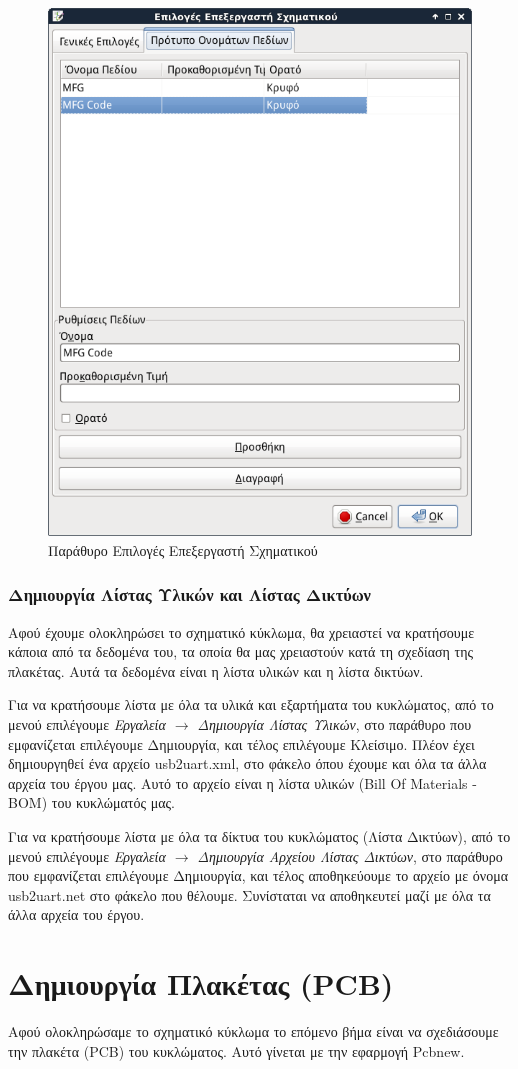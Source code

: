 \documentclass[a4paper]{article}
\begin{document}
\begin{figure}
  \begin{center}
    \includegraphics[width=.35\textwidth]{img/eesch-dial-templ.png}
    \caption{Παράθυρο Επιλογές Επεξεργαστή Σχηματικού}
    \label{fig:eesch-dial-templ}
  \end{center}
\end{figure}

\subsubsection{Δημιουργία Λίστας Υλικών και Λίστας Δικτύων}
Αφού έχουμε ολοκληρώσει το σχηματικό κύκλωμα, θα χρειαστεί να κρατήσουμε κάποια από τα δεδομένα του, τα οποία θα μας χρειαστούν κατά τη σχεδίαση της πλακέτας. Αυτά τα δεδομένα είναι η λίστα υλικών και η λίστα δικτύων.

Για να κρατήσουμε λίστα με όλα τα υλικά και εξαρτήματα του κυκλώματος, από το μενού επιλέγουμε \textit{Εργαλεία $\rightarrow$ Δημιουργία Λίστας Υλικών}, στο παράθυρο που εμφανίζεται επιλέγουμε Δημιουργία, και τέλος επιλέγουμε Κλείσιμο. Πλέον έχει δημιουργηθεί ένα αρχείο usb2uart.xml, στο φάκελο όπου έχουμε και όλα τα άλλα αρχεία του έργου μας. Αυτό το αρχείο είναι η λίστα υλικών (Bill Of Materials - BOM) του κυκλώματός μας.

Για να κρατήσουμε λίστα με όλα τα δίκτυα του κυκλώματος (Λίστα Δικτύων), από το μενού επιλέγουμε \textit{Εργαλεία $\rightarrow$ Δημιουργία Αρχείου Λίστας Δικτύων}, στο παράθυρο που εμφανίζεται επιλέγουμε Δημιουργία, και τέλος αποθηκεύουμε το αρχείο με όνομα usb2uart.net στο φάκελο που θέλουμε. Συνίσταται να αποθηκευτεί μαζί με όλα τα άλλα αρχεία του έργου.



\newpage
\section{Δημιουργία Πλακέτας (PCB)}
Αφού ολοκληρώσαμε το σχηματικό κύκλωμα το επόμενο βήμα είναι να σχεδιάσουμε την πλακέτα (PCB) του κυκλώματος. Αυτό γίνεται με την εφαρμογή Pcbnew.
\end{document}
